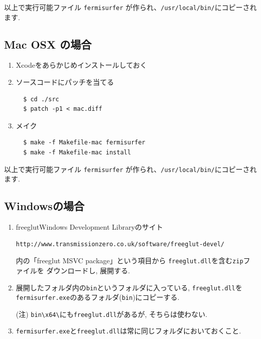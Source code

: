 \documentclass[12pt]{jarticle}
\begin{document}
以上で実行可能ファイル \texttt{fermisurfer} が作られ、\verb|/usr/local/bin/|にコピーされます.

\subsection{Mac OSX の場合}

\begin{enumerate}

\item Xcodeをあらかじめインストールしておく
\item ソースコードにパッチを当てる
\begin{verbatim}
  $ cd ./src
  $ patch -p1 < mac.diff
\end{verbatim}

\item メイク
\begin{verbatim}
  $ make -f Makefile-mac fermisurfer
  $ make -f Makefile-mac install
\end{verbatim}

\end{enumerate}

以上で実行可能ファイル \texttt{fermisurfer} が作られ、\verb|/usr/local/bin/|にコピーされます.

\subsection{Windowsの場合}

\begin{enumerate}

\item freeglutWindows Development Libraryのサイト
\begin{verbatim}
http://www.transmissionzero.co.uk/software/freeglut-devel/
\end{verbatim}
内の「freeglut MSVC package」という項目から
\texttt{freeglut.dll}を含む\texttt{zip}ファイルを
ダウンロードし, 展開する.

\item 展開したフォルダ内の\texttt{bin}というフォルダに入っている,
\texttt{freeglut.dll}を\texttt{fermisurfer.exe}のあるフォルダ(\verb|bin|)にコピーする.

(注) \verb|bin\x64\|にも\verb|freeglut.dll|があるが, そちらは使わない.

\item \verb|fermisurfer.exe|と\verb|freeglut.dll|は常に同じフォルダにおいておくこと.

\end{enumerate}
\end{document}
